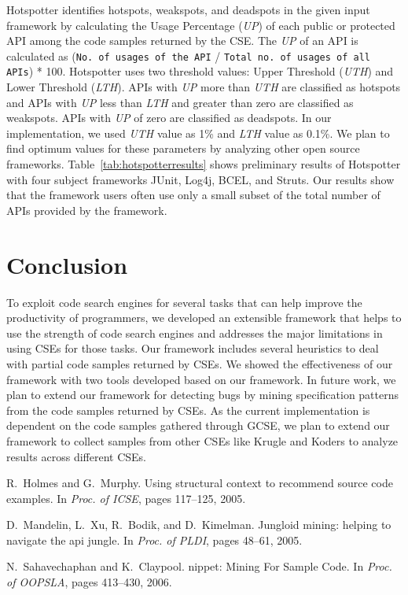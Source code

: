 \documentclass{sigplanconf}
\newcommand{\CodeIn}[1]{{\small\texttt{#1}}}
\begin{document}
Hotspotter identifies hotspots, weakspots, and deadspots in the given input framework by
calculating the Usage Percentage (\emph{UP}) of each public or protected API among
the code samples returned by the CSE. The \emph{UP} of an API is calculated as
(\CodeIn{No. of usages of the API} / \CodeIn{Total no. of usages of all APIs}) * 100.
Hotspotter uses two threshold values: Upper Threshold (\emph{UTH}) and Lower Threshold (\emph{LTH}).
APIs with \emph{UP} more than \emph{UTH} are classified
as hotspots and APIs with \emph{UP} less than \emph{LTH} and greater than zero are classified as weakspots.
APIs with \emph{UP} of zero are classified as deadspots.
In our implementation, we used \emph{UTH} value as 1\% and \emph{LTH} value as 0.1\%.
We plan to find optimum values for these parameters by
analyzing other open source frameworks. Table~\ref{tab:hotspotterresults} shows
preliminary results of Hotspotter with four subject frameworks JUnit, Log4j,
BCEL, and Struts. Our results show that the framework users often use only a small subset of the
total number of APIs provided by the framework.

\section{Conclusion}
\label{sec:conclusion}

To exploit code search engines for several tasks that can help
improve the productivity of programmers, we developed an extensible
framework that helps to use the strength of code search engines and
addresses the major limitations in using CSEs for those tasks. Our
framework includes several heuristics to deal with partial code
samples returned by CSEs. We showed the effectiveness of our
framework with two tools developed based on our framework. In future
work, we plan to extend our framework for detecting bugs by mining
specification patterns from the code samples returned by CSEs. As
the current implementation is dependent on the code samples gathered
through GCSE, we plan to extend our framework to collect samples
from other CSEs like Krugle and Koders to analyze results across
different CSEs.

\begin{thebibliography}{1}

R.~Holmes and G.~Murphy.
\newblock Using structural context to recommend source code examples.
\newblock In {\em Proc. of ICSE}, pages 117--125, 2005.

D.~Mandelin, L.~Xu, R.~Bodik, and D.~Kimelman.
\newblock Jungloid mining: helping to navigate the api jungle.
\newblock In {\em Proc. of PLDI}, pages 48--61, 2005.

N.~Sahavechaphan and K.~Claypool.
nippet: {M}ining {F}or {S}ample {C}ode.
\newblock In {\em Proc. of OOPSLA}, pages 413--430, 2006.

\end{thebibliography}
\end{document}
